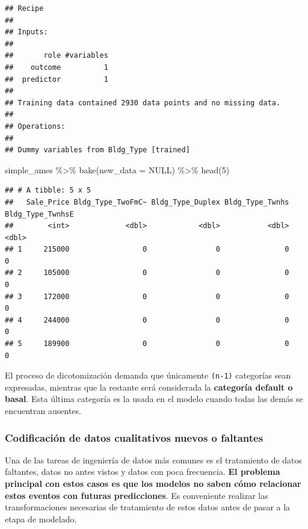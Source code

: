\documentclass[
]{book}
\newenvironment{Shaded}{\begin{snugshade}}{\end{snugshade}}
\newcommand{\AttributeTok}[1]{\textcolor[rgb]{0.77,0.63,0.00}{#1}}
\newcommand{\ConstantTok}[1]{\textcolor[rgb]{0.00,0.00,0.00}{#1}}
\newcommand{\DecValTok}[1]{\textcolor[rgb]{0.00,0.00,0.81}{#1}}
\newcommand{\FunctionTok}[1]{\textcolor[rgb]{0.00,0.00,0.00}{#1}}
\newcommand{\NormalTok}[1]{#1}
\newcommand{\SpecialCharTok}[1]{\textcolor[rgb]{0.00,0.00,0.00}{#1}}
\begin{document}
\begin{verbatim}
## Recipe
## 
## Inputs:
## 
##       role #variables
##    outcome          1
##  predictor          1
## 
## Training data contained 2930 data points and no missing data.
## 
## Operations:
## 
## Dummy variables from Bldg_Type [trained]
\end{verbatim}

\begin{Shaded}
\begin{Highlighting}[]
\NormalTok{simple\_ames }\SpecialCharTok{\%\textgreater{}\%} \FunctionTok{bake}\NormalTok{(}\AttributeTok{new\_data =} \ConstantTok{NULL}\NormalTok{) }\SpecialCharTok{\%\textgreater{}\%} \FunctionTok{head}\NormalTok{(}\DecValTok{5}\NormalTok{)}
\end{Highlighting}
\end{Shaded}

\begin{verbatim}
## # A tibble: 5 x 5
##   Sale_Price Bldg_Type_TwoFmC~ Bldg_Type_Duplex Bldg_Type_Twnhs Bldg_Type_TwnhsE
##        <int>             <dbl>            <dbl>           <dbl>            <dbl>
## 1     215000                 0                0               0                0
## 2     105000                 0                0               0                0
## 3     172000                 0                0               0                0
## 4     244000                 0                0               0                0
## 5     189900                 0                0               0                0
\end{verbatim}

El proceso de dicotomización demanda que únicamente \texttt{(n-1)} categorías sean expresadas, mientras que la restante será considerada la \textbf{categoría default o basal}. Esta última categoría es la usada en el modelo cuando todas las demás se encuentran ausentes.

\hypertarget{codificaciuxf3n-de-datos-cualitativos-nuevos-o-faltantes}{%
\subsubsection{Codificación de datos cualitativos nuevos o faltantes}\label{codificaciuxf3n-de-datos-cualitativos-nuevos-o-faltantes}}

Una de las tareas de ingeniería de datos más comunes es el tratamiento de datos faltantes, datos no antes vistos y datos con poca frecuencia. \textbf{El problema principal con estos casos es que los modelos no saben cómo relacionar estos eventos con futuras predicciones}. Es conveniente realizar las transformaciones necesarias de tratamiento de estos datos antes de pasar a la etapa de modelado.
\end{document}
